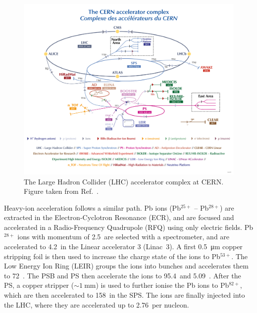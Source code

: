 \begin{figure}[htb]
    \centering
    \includegraphics[width=\textwidth]{Figures/Chapter 3/LHC_Scheme.png}
    \caption{The Large Hadron Collider (LHC) accelerator complex at CERN. Figure taken from Ref.~\cite{Lopienska:2800984}.}
    \label{fig:LHC}
\end{figure}

Heavy-ion acceleration follows a similar path. Pb ions (Pb$^{25+}$ -- Pb$^{28+}$) are extracted in the Electron-Cyclotron Resonance (ECR), and are focused and accelerated in a Radio-Frequency Quadrupole (RFQ) using only electric fields. Pb$^{28+}$ ions with momentum of 2.5~\kevc are selected with a spectrometer, and are accelerated to 4.2~\mevc in the Linear accelerator 3 (Linac~3). A first \SI{0.5}{\micro\meter} copper stripping foil is then used to increase the charge state of the ions to Pb$^{53+}$. The Low Energy Ion Ring (LEIR) groups the ions into bunches and accelerates them to 72~\mev. The PSB and PS then accelerate the ions to 95.4~\mev and 5.09~\gev. After the PS, a copper stripper ($\sim 1~\mathrm{mm}$) is used to further ionise the Pb ions to Pb$^{82+}$, which are then accelerated to 158~\gev in the SPS. The ions are finally injected into the LHC, where they are accelerated up to 2.76~\tev per nucleon.


